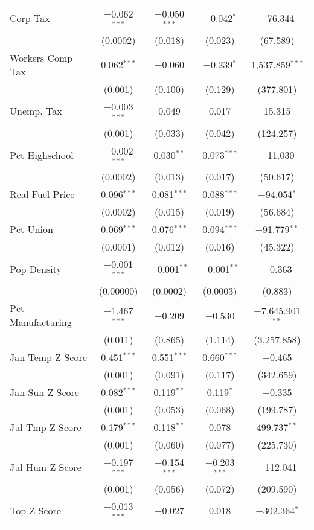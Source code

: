 \begin{table}[!htbp]
\begin{tabular}{@{\extracolsep{5pt}}lcccc}
  Corp Tax & $-$0.062$^{***}$ & $-$0.050$^{***}$ & $-$0.042$^{*}$ & $-$76.344 \\ 
  & (0.0002) & (0.018) & (0.023) & (67.589) \\ 
  Workers Comp Tax & 0.062$^{***}$ & $-$0.060 & $-$0.239$^{*}$ & 1,537.859$^{***}$ \\ 
  & (0.001) & (0.100) & (0.129) & (377.801) \\ 
  Unemp. Tax & $-$0.003$^{***}$ & 0.049 & 0.017 & 15.315 \\ 
  & (0.001) & (0.033) & (0.042) & (124.257) \\ 
  Pct Highschool & $-$0.002$^{***}$ & 0.030$^{**}$ & 0.073$^{***}$ & $-$11.030 \\ 
  & (0.0002) & (0.013) & (0.017) & (50.617) \\ 
  Real Fuel Price & 0.096$^{***}$ & 0.081$^{***}$ & 0.088$^{***}$ & $-$94.054$^{*}$ \\ 
  & (0.0002) & (0.015) & (0.019) & (56.684) \\ 
  Pct Union & 0.069$^{***}$ & 0.076$^{***}$ & 0.094$^{***}$ & $-$91.779$^{**}$ \\ 
  & (0.0001) & (0.012) & (0.016) & (45.322) \\ 
  Pop Density & $-$0.001$^{***}$ & $-$0.001$^{**}$ & $-$0.001$^{**}$ & $-$0.363 \\ 
  & (0.00000) & (0.0002) & (0.0003) & (0.883) \\ 
  Pct Manufacturing & $-$1.467$^{***}$ & $-$0.209 & $-$0.530 & $-$7,645.901$^{**}$ \\ 
  & (0.011) & (0.865) & (1.114) & (3,257.858) \\ 
  Jan Temp Z Score & 0.451$^{***}$ & 0.551$^{***}$ & 0.660$^{***}$ & $-$0.465 \\ 
  & (0.001) & (0.091) & (0.117) & (342.659) \\ 
  Jan Sun Z Score & 0.082$^{***}$ & 0.119$^{**}$ & 0.119$^{*}$ & $-$0.335 \\ 
  & (0.001) & (0.053) & (0.068) & (199.787) \\ 
  Jul Tmp Z Score & 0.179$^{***}$ & 0.118$^{**}$ & 0.078 & 499.737$^{**}$ \\ 
  & (0.001) & (0.060) & (0.077) & (225.730) \\ 
  Jul Hum Z Score & $-$0.197$^{***}$ & $-$0.154$^{***}$ & $-$0.203$^{***}$ & $-$112.041 \\ 
  & (0.001) & (0.056) & (0.072) & (209.590) \\ 
  Top Z Score & $-$0.013$^{***}$ & $-$0.027 & 0.018 & $-$302.364$^{*}$ \\ 

\end{tabular}
\end{table}
